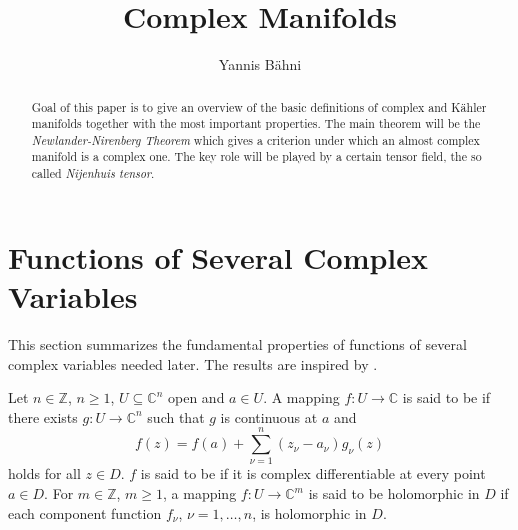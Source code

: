 
\newcommand{\Cscr}{\mathscr{C}}
\newcommand{\op}{\mathrm{op}}
\DeclareMathOperator\End{End}
\DeclareMathOperator\Hom{Hom}
\DeclareMathOperator\Mat{Mat}
\newcommand{\Xfrak}{\mathfrak{X}}
\newcommand{\Ascr}{\mathscr{A}}

\title{Complex Manifolds}
\author{Yannis B\"ahni}
\address[Yannis B\"ahni]{Universität Zürich, R\"amistrasse 71, 8006 Zurich}


\maketitle
\begin{abstract}
Goal of this paper is to give an overview of the basic definitions of complex and K\"ahler manifolds together with the most important properties. The main theorem will be the \emph{Newlander-Nirenberg Theorem} which gives a criterion under which an almost complex manifold is a complex one. The key role will be played by a certain tensor field, the so called \emph{Nijenhuis tensor}.
\end{abstract}

\tableofcontents

\section{Functions of Several Complex Variables}
This section summarizes the fundamental properties of functions of several complex variables needed later. The results are inspired by \cite[14--30]{grauert:complex_manifolds:2010}.

\begin{definition}
Let $n \in \mathbb{Z}$, $n \geq 1$, $U \subseteq \mathbb{C}^n$ open and $a \in U$. A mapping $f : U \to \mathbb{C}$ is said to be  if there exists $g : U \to \mathbb{C}^n$ such that $g$ is continuous at $a$ and
\begin{equation}
f(z) = f(a) + \sum_{\nu = 1}^n(z_\nu - a_\nu)g_\nu(z)
\end{equation} 
\noindent holds for all $z \in D$. $f$ is said to be  if it is complex differentiable at every point $a \in D$. For $m \in \mathbb{Z}$, $m \geq 1$, a mapping $f : U \to \mathbb{C}^m$ is said to be holomorphic in $D$ if each component function $f_\nu$, $\nu = 1,\dots,n$, is holomorphic in $D$.
\label{def:holomorphic}
\end{definition}

